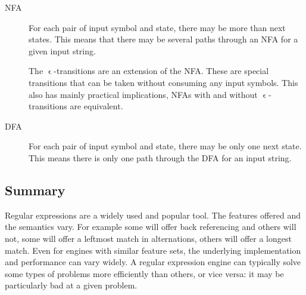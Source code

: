 

\begin{description}
\item[NFA] For each pair of input symbol and state, there may be more
  than next states. This means that there may be several paths
  through an NFA for a given input string.

  The $\upvarepsilon$-transitions are an extension of the NFA. These
  are special transitions that can be taken without consuming any
  input symbols. This also has mainly practical implications, NFAs
  with and without $\upvarepsilon$-transitions are equivalent.

\item[DFA] For each pair of input symbol and state, there may be only
  one next state. This means there is only one path through the DFA
  for an input string.
\end{description}


\subsection{Summary}

Regular expressions are a widely used and popular tool. The features
offered and the semantics vary. For example some will offer
back referencing and others will not, some will offer a leftmost match
in alternations, others will offer a longest match. Even for engines with similar feature sets, the underlying
implementation and performance can vary widely. A regular expression
engine can typically solve some types of problems more efficiently than others, or vice versa: it may be particularly bad at a given problem.


